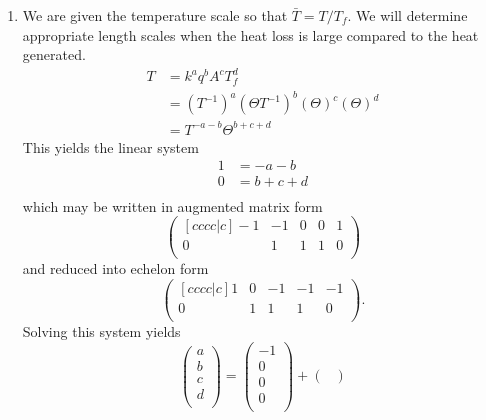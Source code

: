 \documentclass[12pt]{article}
\begin{document}
\begin{enumerate}
\item
  We are given the temperature scale so that $\bar{T}=T/T_f$. We will determine
  appropriate length scales when the heat loss is large compared to the heat
  generated.
  \begin{equation*}
    \begin{aligned}
      T &= k^aq^bA^cT_f^d \\
      &= (T^{-1})^a(\Theta T^{-1})^b(\Theta)^c(\Theta)^d \\
      &= T^{-a-b}\Theta^{b+c+d}
    \end{aligned}
  \end{equation*}
  This yields the linear system
  \begin{equation*}
    \begin{aligned}
      1 &= -a - b \\
      0 &= b + c + d \\
    \end{aligned}
  \end{equation*}
  which may be written in augmented matrix form
  \begin{equation*}
    \begin{pmatrix}[cccc|c]
      -1 & -1 & 0 & 0 & 1 \\
      0 & 1 & 1 & 1 & 0 \\
    \end{pmatrix}
  \end{equation*}
  and reduced into echelon form
  \begin{equation*}
    \begin{pmatrix}[cccc|c]
      1 & 0 & -1 & -1 & -1 \\
      0 & 1 & 1 & 1 & 0 \\
    \end{pmatrix}.
  \end{equation*}
  Solving this system yields
  \begin{equation*}
    \begin{pmatrix}
      a \\ b \\ c \\ d \\
    \end{pmatrix} =
    \begin{pmatrix}
      -1 \\ 0 \\ 0 \\ 0 \\
    \end{pmatrix} +
    \begin{pmatrix}

\end{pmatrix}
\end{equation*}
\end{enumerate}
\end{document}
